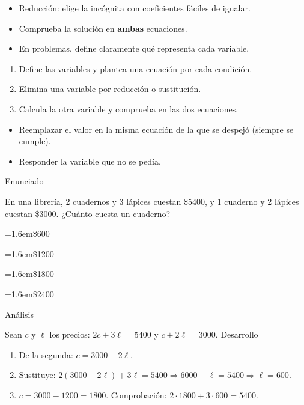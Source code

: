 \documentclass[10pt,a4paper,twocolumn]{article}
\newcommand{\alternativa}[2]{\par\noindent\hangindent=1.6em\hangafter=1\makebox[1.6em][l]{\tecla{#1}}#2\par}
\newcommand{\clave}[1]{\par\smallskip{\sffamily\footnotesize\color{esmeralda} Clave \teclaok{#1}}\par}
\begin{document}
\begin{ideasclave}
\begin{itemize}
  \item Reducción: elige la incógnita con coeficientes fáciles de igualar.
  \item Comprueba la solución en \textbf{ambas} ecuaciones.
  \item En problemas, define claramente qué representa cada variable.
\end{itemize}
\end{ideasclave}

\begin{metodo}
\begin{enumerate}
  \item Define las variables y plantea una ecuación por cada condición.
  \item Elimina una variable por reducción o sustitución.
  \item Calcula la otra variable y comprueba en las dos ecuaciones.
\end{enumerate}
\end{metodo}

\begin{errorfrecuente}
\begin{itemize}
  \item Reemplazar el valor en la misma ecuación de la que se despejó (siempre se cumple).
  \item Responder la variable que no se pedía.
\end{itemize}
\end{errorfrecuente}

\begin{ejemplo}
{\sffamily\footnotesize\color{zinc500} Enunciado}\par
En una librería, 2 cuadernos y 3 lápices cuestan \$5400, y 1 cuaderno y 2 lápices cuestan \$3000. ¿Cuánto cuesta un cuaderno?
\alternativa{A}{\$600}
\alternativa{B}{\$1200}
\alternativa{C}{\$1800}
\alternativa{D}{\$2400}
\clave{C}
{\sffamily\footnotesize\color{zinc500} Análisis}\par Sean $c$ y $\ell$ los precios: $2c+3\ell=5400$ y $c+2\ell=3000$.
{\sffamily\footnotesize\color{zinc500} Desarrollo}
\begin{enumerate}
  \item De la segunda: $c=3000-2\ell$.
  \item Sustituye: $2(3000-2\ell)+3\ell=5400 \Rightarrow 6000-\ell=5400 \Rightarrow \ell=600$.
  \item $c=3000-1200=1800$. Comprobación: $2\cdot 1800+3\cdot 600=5400$.
\end{enumerate}
\end{ejemplo}
\end{document}
